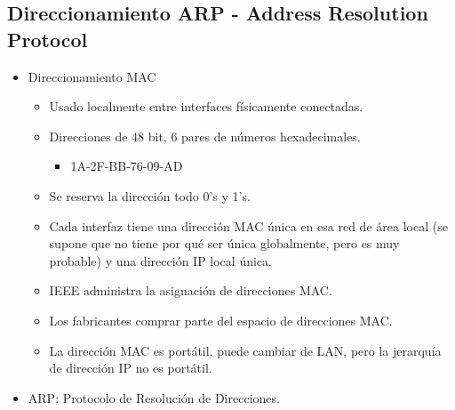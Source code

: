 \documentclass[12pt, twoside, openright]{report} %
\begin{document}
\subsection{Direccionamiento ARP - Address Resolution Protocol}

\begin{itemize}
	\item Direccionamiento MAC

	      \begin{itemize}
		      \item Usado localmente entre interfaces físicamente conectadas.
		      \item Direcciones de 48 bit, 6 pares de números hexadecimales.

		            \begin{itemize}
			            \item 1A-2F-BB-76-09-AD
		            \end{itemize}
		      \item Se reserva la dirección todo 0's y 1's.
		      \item Cada interfaz tiene una dirección MAC única en esa red de área
		            local (se supone que no tiene por qué ser única globalmente,
		            pero es muy probable) y una dirección IP local única.
		      \item IEEE administra la asignación de direcciones MAC.
		      \item Los fabricantes comprar parte del espacio de direcciones MAC.
		      \item La dirección MAC es portátil, puede cambiar de LAN, pero la
		            jerarquía de dirección IP no es portátil.
	      \end{itemize}
	\item ARP: Protocolo de Resolución de Direcciones.


\end{itemize}
\end{document}

